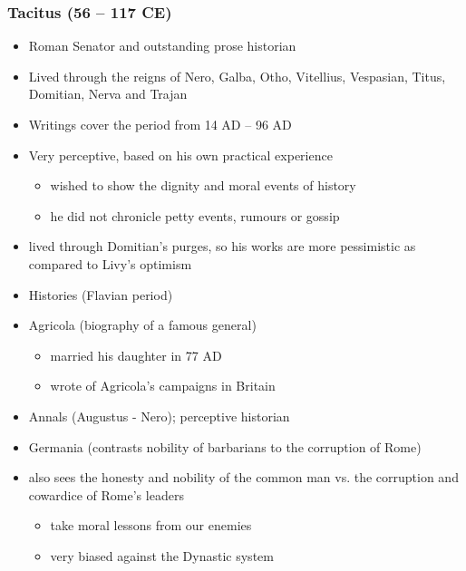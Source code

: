 \documentclass[12pt, twoside]{article}
\begin{document}
\subsubsection{Tacitus (56 – 117 CE)}
\begin{itemize}
\item Roman Senator and outstanding prose historian
\item Lived through the reigns of Nero, Galba, Otho, Vitellius, Vespasian, Titus, Domitian, Nerva and Trajan
\item Writings cover the period from 14 AD – 96 AD
\item Very perceptive, based on his own practical experience
	\begin{itemize}
	\item wished to  show the dignity and moral events of history
	\item he did not chronicle petty events, rumours or gossip
	\end{itemize}
\item lived through Domitian’s purges, so his works are more pessimistic as compared to Livy’s optimism
\item Histories (Flavian period)
\item Agricola (biography of a famous general)
	\begin{itemize}
	\item married his daughter in 77 AD
	\item wrote of Agricola’s campaigns in Britain
	\end{itemize}
\item Annals (Augustus - Nero); perceptive historian
\item Germania (contrasts nobility of barbarians to the corruption of Rome)
\item also sees the honesty and nobility of the common man vs. the corruption and cowardice of Rome’s leaders
	\begin{itemize}
	\item take moral lessons from our enemies
	\item very biased against the Dynastic system
	\end{itemize}
\end{itemize}
	
\end{document}
